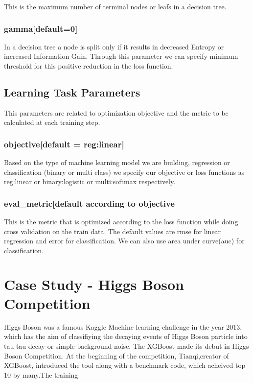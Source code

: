 This is the maximum number of terminal nodes or leafs in a decision tree.

\subsubsection{gamma[default=0]} 

In a decision tree a node is split only if it results in decreased Entropy or increased 
Information Gain. Through this parameter  we can specify minimum threshold for this positive 
reduction in the loss function.

\subsection{Learning Task Parameters} 

This parameters are related to optimization objective and the metric to be calculated at
each training step.

\subsubsection{objective[default = reg:linear]}

Based on the type of machine learning model we are building, regression or classification
(binary or multi class) we specify our objective or loss functions as reg:linear or
binary:logistic or  multi:softmax respectively.

\subsubsection{eval\_metric[default according to objective}

This is the metric that is optimized according to the loss function while doing cross 
validation on the train data. The default values are rmse for linear regression and  error 
for classification. We can also use area under curve(auc) for classification.

\section{Case Study - Higgs Boson Competition}

Higgs Boson was a famous Kaggle Machine learning challenge in the year 2013, which has the 
aim of classifiying the decaying events of Higgs Boson particle into tau-tau decay or simple 
background noise. The XGBoost made its debut in Higgs Boson Competition. At the beginning of 
the competition, Tianqi,creator of XGBoost, introduced the tool along with a benchmark code, 
which acheived top 10%
by many.The training 

